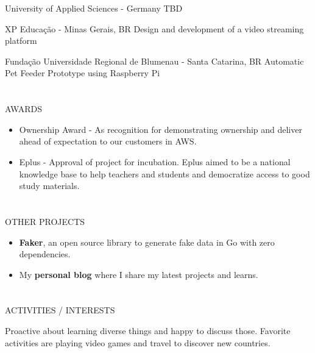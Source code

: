 \documentclass{my_cv}
\begin{document}
\begin{multicols}{2}
{University of Applied Sciences - Germany} %
{TBD}

{XP Educação - Minas Gerais, BR} %
{Design and development of a video streaming platform}

{Fundação Universidade Regional de Blumenau - Santa Catarina, BR} %
{Automatic Pet Feeder Prototype using Raspberry Pi}

\section{\faStar}{AWARDS}

\begin{itemize}[noitemsep]
    \item Ownership Award - As recognition for demonstrating ownership and deliver ahead of expectation to our customers in AWS.
    \item Eplus - Approval of project for incubation. Eplus aimed to be a national knowledge base to help teachers and students and democratize access to good study materials.
\end{itemize}

\section{\faBookmark}{OTHER PROJECTS}
\begin{itemize}[noitemsep]
    \item \textbf{Faker}, an open source library to generate fake data in Go with zero dependencies.
    \item My \textbf{personal blog} where I share my latest projects and learns.
\end{itemize}

\section{\faCoffee}{ACTIVITIES / INTERESTS}

Proactive about learning diverse things and happy to discuss those. Favorite activities are playing video games and travel to discover new countries.


\end{multicols}
\end{document}
